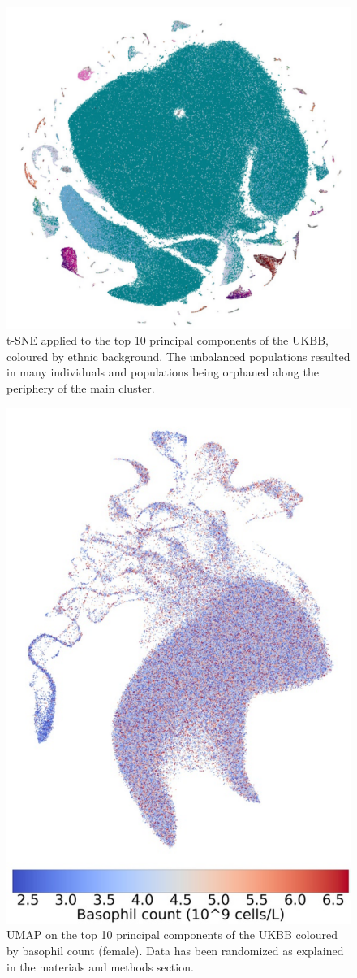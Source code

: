 \documentclass[12pt]{pnas-new}
\begin{document}
\begin{figure}[!htb]
    \centering
    \includegraphics[width=0.95\columnwidth]{images/UKBB_TSNE_10PCs_DefaultPerplexity_eth.pdf}
    \caption{t-SNE applied to the top 10 principal components of the UKBB, coloured by ethnic background. The unbalanced populations resulted in many individuals and populations being orphaned along the periphery of the main cluster.}
    \label{fig:supp_ukbb_tsne}
\end{figure}

\begin{figure}
    \centering
    \includegraphics[width=0.4\columnwidth]{images/UKBB_UMAP_PC10_NN15_MD05_2018328174511_201871417039_basophill_count_pct5_f.pdf}
    \caption{UMAP on the top 10 principal components of the UKBB coloured by basophil count (female). Data has been randomized as explained in the materials and methods section.}
    \label{fig:supp_ukbb_basophill_f}
\end{figure}
\end{document}
